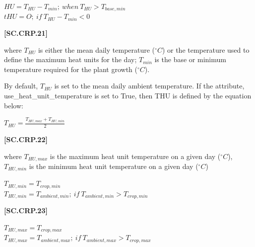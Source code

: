     \begin{center}
        \(HU = T_{HU} - T_{min};\ when\ T_{HU}>T_{base,min}\)\\
        \(tHU = O;\ if\ T_{HU} - T_{min}<0\)
    \end{center}
        \vspace{0.5cm}
    
            {\raggedleft \textbf{[SC.CRP.21]}\par}
            \vspace{0.5cm}

where \(T_{HU}\) is either the mean daily temperature (\(^\circ C\)) or the temperature used to define the maximum heat units for the day; \(T_{min}\) is the base or minimum temperature required for the plant growth (\(^\circ C\)).

By default, \(T_{HU}\) is  set to the mean daily ambient temperature. If the attribute, use\_heat\_unit\_temperature is set to True, then  THU is defined by the equation below:
    \vspace{0.2cm}

    \begin{center}
        \(T_{HU}= \frac{T_{HU,max} + T_{HU,min}}{2}\)
    \end{center}
        \vspace{0.5cm}
    
            {\raggedleft \textbf{[SC.CRP.22]}\par}
            \vspace{0.5cm}

where \(T_{HU,max}\) is the maximum heat unit temperature on a given day (\(^\circ C\)), \(T_{HU,min}\) is the minimum heat unit temperature on a given day (\(^\circ C\))
    \vspace{0.2cm}

    \begin{center}
        \(T_{HU,min} = T_{crop,min}\)\\
        \(T_{HU,min} = T_{ambient,min};\ if\ T_{ambient,min} > T_{crop,min}\)
    \end{center}
        \vspace{0.5cm}
    
            {\raggedleft \textbf{[SC.CRP.23]}\par}
            \vspace{0.5cm}

    \begin{center}
        \(T_{HU,max} = T_{crop,max}\)\\
        \(T_{HU,max} = T_{ambient,max};\ if\ T_{ambient,max} > T_{crop,max}\)
    \end{center}
        \vspace{0.5cm}
    
